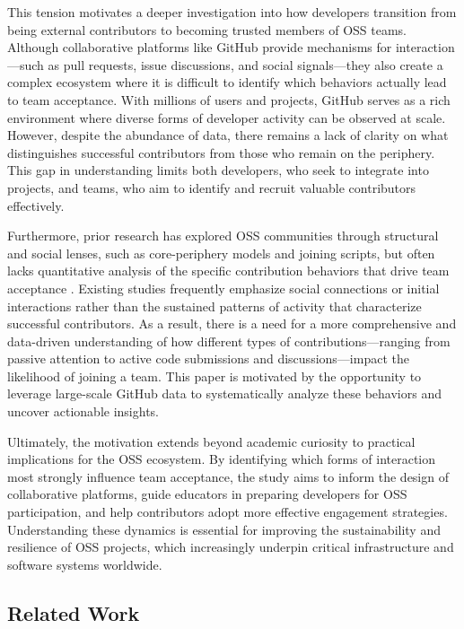 This tension motivates a deeper investigation into how developers transition from being external contributors to becoming trusted members of OSS teams. Although collaborative platforms like GitHub provide mechanisms for interaction—such as pull requests, issue discussions, and social signals—they also create a complex ecosystem where it is difficult to identify which behaviors actually lead to team acceptance. With millions of users and projects, GitHub serves as a rich environment where diverse forms of developer activity can be observed at scale. However, despite the abundance of data, there remains a lack of clarity on what distinguishes successful contributors from those who remain on the periphery. This gap in understanding limits both developers, who seek to integrate into projects, and teams, who aim to identify and recruit valuable contributors effectively.

Furthermore, prior research has explored OSS communities through structural and social lenses, such as core-periphery models and joining scripts, but often lacks quantitative analysis of the specific contribution behaviors that drive team acceptance \cite{1_Nakakoji2003}. Existing studies frequently emphasize social connections or initial interactions rather than the sustained patterns of activity that characterize successful contributors. As a result, there is a need for a more comprehensive and data-driven understanding of how different types of contributions—ranging from passive attention to active code submissions and discussions—impact the likelihood of joining a team. This paper is motivated by the opportunity to leverage large-scale GitHub data to systematically analyze these behaviors and uncover actionable insights.

Ultimately, the motivation extends beyond academic curiosity to practical implications for the OSS ecosystem. By identifying which forms of interaction most strongly influence team acceptance, the study aims to inform the design of collaborative platforms, guide educators in preparing developers for OSS participation, and help contributors adopt more effective engagement strategies. Understanding these dynamics is essential for improving the sustainability and resilience of OSS projects, which increasingly underpin critical infrastructure and software systems worldwide.

\subsection{Related Work}
